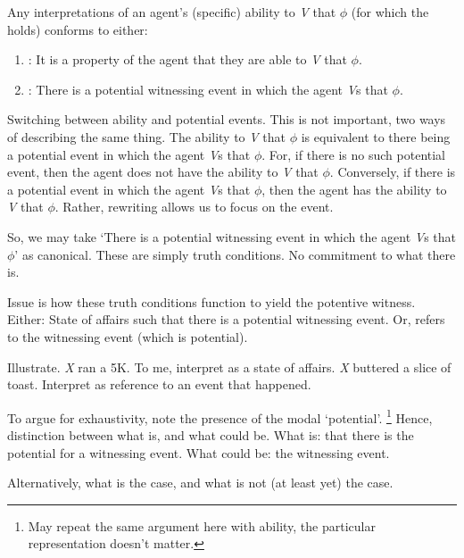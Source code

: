 \begin{note}[Exhaustive]
  \begin{proposition}\label{prop:WR-and-AR-exhaustive}\label{either-AR-or-WR}
    Any interpretations of an agent's (specific) ability to \emph{V} that \(\phi\) (for which the \aben{} holds) conforms to either:
    \begin{enumerate}
    \item \AR{}: It is a property of the agent that they are able to \emph{V} that \(\phi\).
    \item \WR{}: There is a potential witnessing event in which the agent \emph{V}s that \(\phi\).
    \end{enumerate}
    \vspace{-\topsep}\vspace{-\topsep}
  \end{proposition}
  Switching between ability and potential events.
  This is not important, two ways of describing the same thing.
  The ability to \emph{V} that \(\phi\) is equivalent to there being a potential event in which the agent \emph{V}s that \(\phi\).
  For, if there is no such potential event, then the agent does not have the ability to \emph{V} that \(\phi\).
  Conversely, if there is a potential event in which the agent \emph{V}s that \(\phi\), then the agent has the ability to \emph{V} that \(\phi\).
  Rather, rewriting allows us to focus on the event.

  So, we may take `There is a potential witnessing event in which the agent \emph{V}s that \(\phi\)' as canonical.
  These are simply truth conditions.
  No commitment to what there is.

  Issue is how these truth conditions function to yield the potentive witness.
  Either:
  State of affairs such that there is a potential witnessing event.
  Or, refers to the witnessing event (which is potential).

  Illustrate.
  \emph{X} ran a 5K.
  To me, interpret as a state of affairs.
  \emph{X} buttered a slice of toast.
  Interpret as reference to an event that happened.

  To argue for exhaustivity, note the presence of the modal `potential'.\nolinebreak
  \footnote{
    May repeat the same argument here with ability, the particular representation doesn't matter.
  }
  Hence, distinction between what is, and what could be.
  What is: that there is the potential for a witnessing event.
  What could be: the witnessing event.

  Alternatively, what is the case, and what is not (at least yet) the case.


\end{note}
